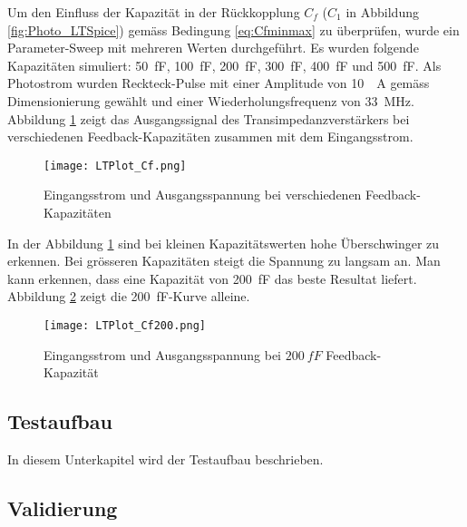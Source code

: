 Um den Einfluss der Kapazität in der Rückkopplung $C_{f}$ ($C_{1}$ in Abbildung \ref{fig:Photo_LTSpice}) gemäss Bedingung \ref{eq:Cfminmax} zu überprüfen, wurde ein Parameter-Sweep mit mehreren Werten durchgeführt. Es wurden folgende Kapazitäten simuliert: \SI{50}{fF}, \SI{100}{fF}, \SI{200}{fF}, \SI{300}{fF}, \SI{400}{fF} und \SI{500}{fF}. Als Photostrom wurden Reckteck-Pulse mit einer Amplitude von \SI{10}{\mu A} gemäss Dimensionierung gewählt und einer Wiederholungsfrequenz von \SI{33}{MHz}.
Abbildung \ref{fig:Plot_Cf} zeigt das Ausgangssignal des Transimpedanzverstärkers bei verschiedenen Feedback-Kapazitäten zusammen mit dem Eingangsstrom.
\begin{figure}[H]
	\centering
	\texttt{[image: LTPlot\_Cf.png]}
	\caption{Eingangsstrom und Ausgangsspannung bei verschiedenen Feedback-Kapazitäten}\label{fig:Plot_Cf}
\end{figure}
In der Abbildung \ref{fig:Plot_Cf} sind bei kleinen Kapazitätswerten hohe Überschwinger zu erkennen. Bei grösseren Kapazitäten steigt die Spannung zu langsam an. Man kann erkennen, dass eine Kapazität von \SI{200}{fF} das beste Resultat liefert. Abbildung \ref{fig:Plot_Cf200} zeigt die \SI{200}{fF}-Kurve alleine.

\begin{figure}[H]
	\centering
	\texttt{[image: LTPlot\_Cf200.png]}
	\caption{Eingangsstrom und Ausgangsspannung bei $\SI{200}{fF}$ Feedback-Kapazität}\label{fig:Plot_Cf200}
\end{figure}

\subsection{Testaufbau}
In diesem Unterkapitel wird der Testaufbau beschrieben.

\subsection{Validierung} 
